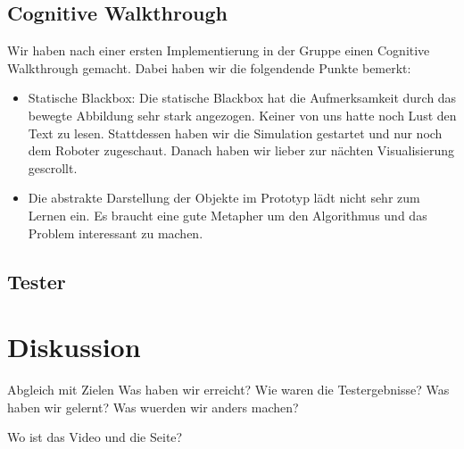 \subsection{Cognitive Walkthrough}\label{sec:cogWal}
Wir haben nach einer ersten Implementierung in der Gruppe einen Cognitive Walkthrough gemacht. Dabei haben wir die folgendende Punkte bemerkt:
\begin{itemize}
	\item Statische Blackbox: Die statische Blackbox hat die Aufmerksamkeit durch das bewegte Abbildung sehr stark angezogen. Keiner von uns hatte noch Lust den Text zu lesen. Stattdessen haben wir die Simulation gestartet und nur noch dem Roboter zugeschaut. Danach haben wir lieber zur nächten Visualisierung gescrollt.
	\item Die abstrakte Darstellung der Objekte im Prototyp lädt nicht sehr zum Lernen ein. Es braucht eine gute Metapher um den Algorithmus und das Problem interessant zu machen.
\end{itemize}

\subsection{Tester}

\section{Diskussion}
Abgleich mit Zielen
Was haben wir erreicht?
Wie waren die Testergebnisse?
Was haben wir gelernt?
Was wuerden wir anders machen?

Wo ist das Video und die Seite?